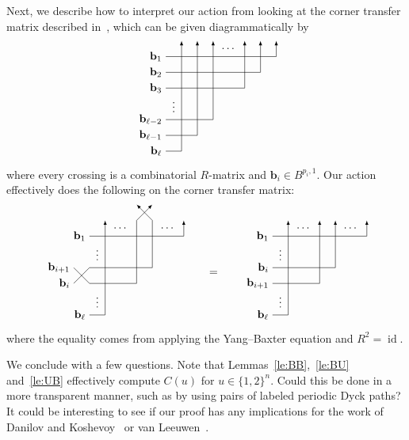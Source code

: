 \documentclass[reqno]{amsart}
\newcommand{\0}{\phantom{c}}
\DeclareMathOperator{\id}{id} %
\theoremstyle{plain}
\theoremstyle{definition}
\numberwithin{equation}{section}
\begin{document}
Next, we describe how to interpret our action from looking at the corner transfer matrix described in~\cite{KMO15}, which can be given diagrammatically by
\[
\begin{tikzpicture}[>=latex,scale=0.5]
\draw[->] (0,1) node[anchor=east] {$\mathbf{b}_{\ell}$} -- (1,1) -- (1,8);
\foreach \x in {1,2} {
  \draw[->] (0,\x+1) node[anchor=east] {$\mathbf{b}_{\ell-\x}$} -- (\x+1,\x+1) -- (\x+1,8);
}
\foreach \x in {1,2,3} {
  \draw[->] (0,8-\x) node[anchor=east] {$\mathbf{b}_{\x}$} -- (8-\x,8-\x) -- (8-\x,8);
}
\node at (4,7.5) {$\cdots$};
\node at (0.5,4) {$\vdots$};
\end{tikzpicture}
\]
where every crossing is a combinatorial $R$-matrix and $\mathbf{b}_i \in B^{p_i,1}$.
Our action effectively does the following on the corner transfer matrix:
\[
\begin{tikzpicture}[>=latex,scale=0.5,baseline=50]
\draw[->] (0,1) node[anchor=east] {$\mathbf{b}_{\ell}$} -- (1,1) -- (1,7);
\draw[->] (0,6) node[anchor=east] {$\mathbf{b}_1$} -- (6,6) -- (6,7);
\draw[->] (-1,3) node[anchor=east] {$\mathbf{b}_i$} -- (0,4) -- (4,4) -- (4,7) -- (3,8);
\draw[->] (-1,4) node[anchor=east] {$\mathbf{b}_{i+1}$} -- (0,3) -- (3,3) -- (3,7) -- (4,8);
\node at (2,6.5) {$\cdots$};
\node at (0.5,2) {$\vdots$};
\node at (5,6.5) {$\cdots$};
\node at (0.5,5) {$\vdots$};
\end{tikzpicture}
\qquad = \qquad
\begin{tikzpicture}[>=latex,scale=0.5,baseline=50]
\draw[->] (0,1) node[anchor=east] {$\mathbf{b}_{\ell}$} -- (1,1) -- (1,7);
\draw[->] (0,6) node[anchor=east] {$\mathbf{b}_1$} -- (6,6) -- (6,7);
\draw[->] (0,4) node[anchor=east] {$\mathbf{b}_i$} -- (4,4) -- (4,7);
\draw[->] (0,3) node[anchor=east] {$\mathbf{b}_{i+1}$} -- (3,3) -- (3,7);
\node at (2,6.5) {$\cdots$};
\node at (0.5,2) {$\vdots$};
\node at (5,6.5) {$\cdots$};
\node at (0.5,5) {$\vdots$};
\end{tikzpicture}
\]
where the equality comes from applying the Yang--Baxter equation and $R^2 = \id$.

We conclude with a few questions.
Note that Lemmas~\ref{le:BB},~\ref{le:BU} and~\ref{le:UB} effectively compute $C(u)$ for $u \in \{1,2\}^n$.
Could this be done in a more transparent manner, such as by using pairs of labeled periodic Dyck paths?
It could be interesting to see if our proof has any implications for the work of Danilov and Koshevoy~\cite{DanilovKoshevoy} or van Leeuwen~\cite{vanLeeuwen-dc}.



{}
\end{document}
